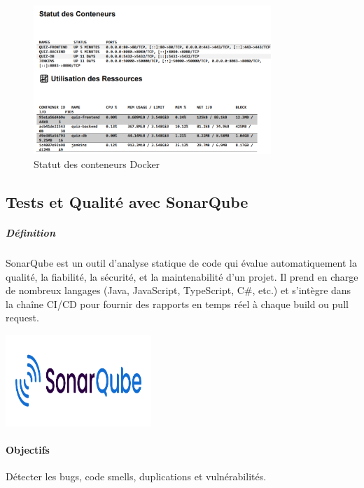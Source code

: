 \documentclass[12pt,a4paper,twoside]{report}
\begin{document}
\begin{figure}[H]
\centering
\includegraphics[width=0.8\textwidth]{latex_media/media/image40.png}
\caption{Statut des conteneurs Docker}
\label{fig:statut-conteneurs}
\end{figure}

\hypertarget{tests-et-qualituxe9-avec-sonarqube}{%
\subsection{Tests et Qualité avec
SonarQube}\label{tests-et-qualituxe9-avec-sonarqube}}

\hypertarget{duxe9finition}{%
\subparagraph{Définition}\label{duxe9finition}}

SonarQube est un outil d'analyse statique de code qui évalue
automatiquement la qualité, la fiabilité, la sécurité, et la
maintenabilité d'un projet. Il prend en charge de nombreux langages
(Java, JavaScript, TypeScript, C\#, etc.) et s'intègre dans la chaîne
CI/CD pour fournir des rapports en temps réel à chaque build ou pull
request.

\includegraphics[width=2.17222in,height=1.36111in]{latex_media/media/image41.png}

\hypertarget{objectifs}{%
\paragraph{\texorpdfstring{ Objectifs}{ Objectifs}}\label{objectifs}}

Détecter les bugs, code smells, duplications et vulnérabilités.
\end{document}

